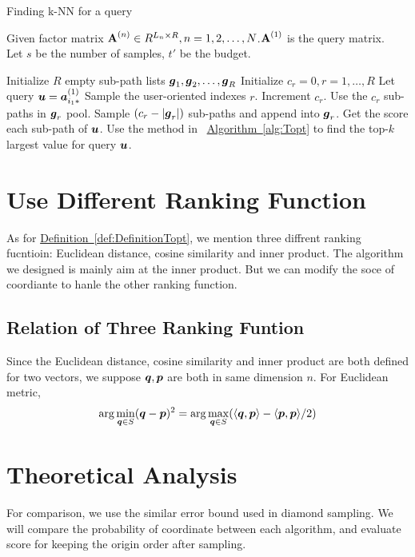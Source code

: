 \documentclass[letterpaper]{article}
\newcommand{\V}[1]{{\bm{{\MakeLowercase{#1}}}}}
\newcommand{\VnC}[3]{\V{#1}^{(#2)}_{#3}}
\newcommand{\M}[1]{{\bm{\mathbf{\MakeUppercase{#1}}}}}
\newcommand{\Def}[1] {\hyperref[def:#1] {Definition~\ref*{def:#1}}}
\newcommand{\Alg}[1] {\hyperref[alg:#1] {Algorithm~\ref*{alg:#1}}}
\begin{document}
\begin{algorithm}[t]
    \caption{Finding k-NN for a query}\label{alg:QuerySampling}
        Given factor matrix $\M{A}^{(n)}\in R^{L_n\times R}, n = 1,2,\ldots,N$.$\M{A}^{(1)}$ is the query matrix.\\
        Let $s$ be the number of samples, $t'$ be the budget.
    \begin{algorithmic}[1]
    \State Initialize $R$ empty sub-path lists $\V{g}_1,\V{g}_2,\ldots,\V{g}_R$
    \State Initialize $c_r = 0,r= 1,\ldots,R$
    \State Let query $\V{u}=\VnC{a}{1}{i_1*}$
    \State Sample the user-oriented indexes $r$. \label{line:Indexes}
    \State  Increment $c_r$.
    \EndFor
    \If {$c_r\leq |\V{g}_r|$ }
    \State Use the $c_r$ sub-paths in $\V{g}_r$ pool.
    \Else
    \State Sample $(c_r - |\V{g}_r|)$ sub-paths and append into $\V{g}_r$.
    \EndIf
    \State Get the score each sub-path of $\V{u}$.
    \State Use the method in ~\Alg{Topt} to find the top-$k$ largest value for query $\V{u}$.
    \EndFor
    \EndFor
    \end{algorithmic}
\end{algorithm}


\section{Use Different Ranking Function}
As for \Def{DefinitionTopt}, we mention three diffrent ranking fucntioin: Euclidean distance, cosine similarity and inner product. The algorithm we designed is  mainly aim at the inner product. But we can modify the soce of coordiante to hanle the other ranking function.

\subsection{Relation of Three Ranking Funtion}
Since the Euclidean distance, cosine similarity and inner product are both defined for two vectors, we suppose $\V{q},\V{p}$ are both in same dimension $n$. For Euclidean metric,
\[
\arg\min_{\V{q} \in S}(\V{q}-\V{p})^2 = \arg\max_{\V{q} \in S}(\langle\V{q},\V{p}\rangle-\langle\V{p},\V{p}\rangle/2)
\]
\section{Theoretical Analysis}

For comparison, we use the similar error bound used in diamond sampling. 
We will compare the probability of coordinate between each algorithm, and evaluate score for keeping the origin order after sampling.
\end{document}
